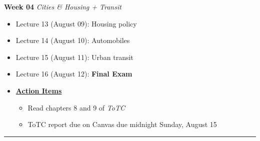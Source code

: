 \documentclass[11pt]{article}
\begin{document}
		\textbf{Week 04} \textit{Cities \& Housing + Transit}
	\begin{itemize}
		\item Lecture 13 (August 09): Housing policy
		\item Lecture 14 (August 10): Automobiles
		\item Lecture 15 (August 11): Urban transit
		\item Lecture 16 (August 12):  \textbf{Final Exam}
		\item[]\underline{\textbf{Action Items}}
		\begin{itemize}
				\item Read chapters 8 and 9 of \textit{ToTC}
				\item ToTC report due on Canvas due midnight Sunday, August 15
		\end{itemize}
	\end{itemize}
	\noindent\rule[0.5ex]{\linewidth}{1pt}
	
\end{document}
